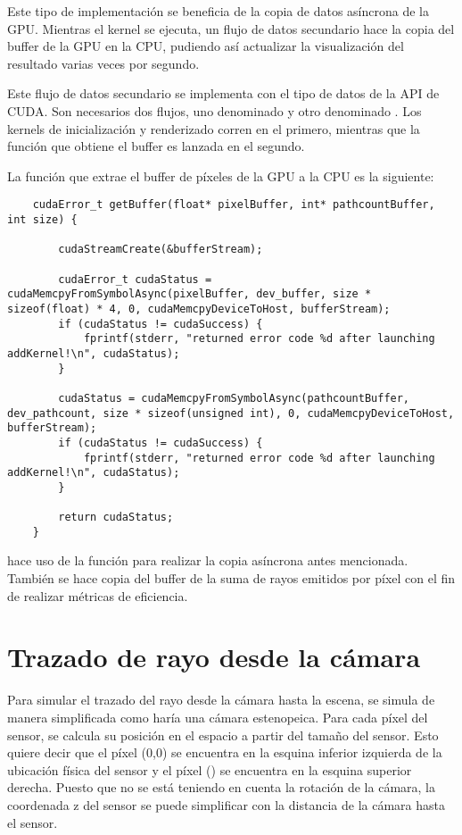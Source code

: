 	Este tipo de implementación se beneficia de la copia de datos asíncrona de la GPU. Mientras el kernel se ejecuta, un flujo de datos secundario hace la copia del buffer de la GPU en la CPU, pudiendo así actualizar la visualización del resultado varias veces por segundo.

	Este flujo de datos secundario se implementa con el tipo de datos  de la API de CUDA. Son necesarios dos flujos, uno denominado  y otro denominado . Los kernels de inicialización y renderizado corren en el primero, mientras que la función que obtiene el buffer es lanzada en el segundo.
	
	La función que extrae el buffer de píxeles de la GPU a la CPU es la siguiente:
	
	\begin{lstlisting}
	cudaError_t getBuffer(float* pixelBuffer, int* pathcountBuffer, int size) {

		cudaStreamCreate(&bufferStream);

		cudaError_t cudaStatus = cudaMemcpyFromSymbolAsync(pixelBuffer, dev_buffer, size * sizeof(float) * 4, 0, cudaMemcpyDeviceToHost, bufferStream);
		if (cudaStatus != cudaSuccess) {
			fprintf(stderr, "returned error code %d after launching addKernel!\n", cudaStatus);
		}

		cudaStatus = cudaMemcpyFromSymbolAsync(pathcountBuffer, dev_pathcount, size * sizeof(unsigned int), 0, cudaMemcpyDeviceToHost, bufferStream);
		if (cudaStatus != cudaSuccess) {
			fprintf(stderr, "returned error code %d after launching addKernel!\n", cudaStatus);
		}

		return cudaStatus;
	}
	\end{lstlisting}
	
	 hace uso de la función  para realizar la copia asíncrona antes mencionada. También se hace copia del buffer de la suma de rayos emitidos por píxel con el fin de realizar métricas de eficiencia.
	


\section{Trazado de rayo desde la cámara}
\label{sec:calculatecameraray}

Para simular el trazado del rayo desde la cámara hasta la escena, se simula de manera simplificada como haría una cámara estenopeica. Para cada píxel del sensor, se calcula su posición en el espacio a partir del tamaño del sensor. Esto quiere decir que el píxel (0,0) se encuentra en la esquina inferior izquierda de la ubicación física del sensor y el píxel () se encuentra en la esquina superior derecha. Puesto que no se está teniendo en cuenta la rotación de la cámara, la coordenada z del sensor se puede simplificar con la distancia de la cámara hasta el sensor.

